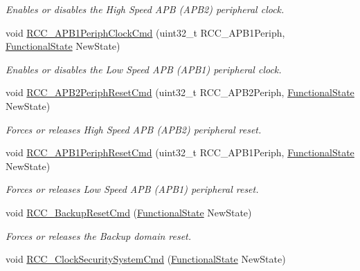 \begin{DoxyCompactItemize}
\begin{DoxyCompactList}\small\item\em Enables or disables the High Speed A\+PB (A\+P\+B2) peripheral clock. \end{DoxyCompactList}\item 
void \mbox{\hyperlink{group___r_c_c___private___functions_gaee7cc5d73af7fe1986fceff8afd3973e}{R\+C\+C\+\_\+\+A\+P\+B1\+Periph\+Clock\+Cmd}} (uint32\+\_\+t R\+C\+C\+\_\+\+A\+P\+B1\+Periph, \mbox{\hyperlink{group___exported__types_gac9a7e9a35d2513ec15c3b537aaa4fba1}{Functional\+State}} New\+State)
\begin{DoxyCompactList}\small\item\em Enables or disables the Low Speed A\+PB (A\+P\+B1) peripheral clock. \end{DoxyCompactList}\item 
void \mbox{\hyperlink{group___r_c_c___private___functions_gad94553850ac07106a27ee85fec37efdf}{R\+C\+C\+\_\+\+A\+P\+B2\+Periph\+Reset\+Cmd}} (uint32\+\_\+t R\+C\+C\+\_\+\+A\+P\+B2\+Periph, \mbox{\hyperlink{group___exported__types_gac9a7e9a35d2513ec15c3b537aaa4fba1}{Functional\+State}} New\+State)
\begin{DoxyCompactList}\small\item\em Forces or releases High Speed A\+PB (A\+P\+B2) peripheral reset. \end{DoxyCompactList}\item 
void \mbox{\hyperlink{group___r_c_c___private___functions_gab197ae4369c10b92640a733b40ed2801}{R\+C\+C\+\_\+\+A\+P\+B1\+Periph\+Reset\+Cmd}} (uint32\+\_\+t R\+C\+C\+\_\+\+A\+P\+B1\+Periph, \mbox{\hyperlink{group___exported__types_gac9a7e9a35d2513ec15c3b537aaa4fba1}{Functional\+State}} New\+State)
\begin{DoxyCompactList}\small\item\em Forces or releases Low Speed A\+PB (A\+P\+B1) peripheral reset. \end{DoxyCompactList}\item 
void \mbox{\hyperlink{group___r_c_c___private___functions_ga636c3b72f35391e67f12a551b15fa54a}{R\+C\+C\+\_\+\+Backup\+Reset\+Cmd}} (\mbox{\hyperlink{group___exported__types_gac9a7e9a35d2513ec15c3b537aaa4fba1}{Functional\+State}} New\+State)
\begin{DoxyCompactList}\small\item\em Forces or releases the Backup domain reset. \end{DoxyCompactList}\item 
void \mbox{\hyperlink{group___r_c_c___private___functions_ga0ff1fd7b9a8a49cdda11b7d7261c3494}{R\+C\+C\+\_\+\+Clock\+Security\+System\+Cmd}} (\mbox{\hyperlink{group___exported__types_gac9a7e9a35d2513ec15c3b537aaa4fba1}{Functional\+State}} New\+State)

\end{DoxyCompactItemize}
